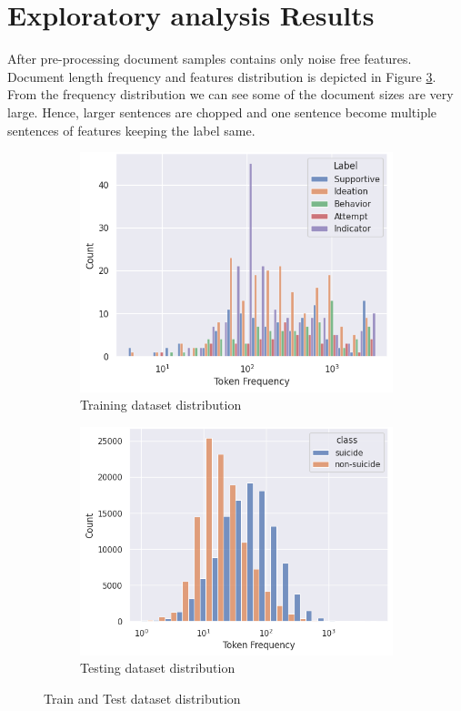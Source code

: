 \documentclass[sn-mathphys,Numbered]{sn-jnl}%
\theoremstyle{thmstyleone}%
\theoremstyle{thmstyletwo}%
\theoremstyle{thmstylethree}%
\begin{document}
\section{Exploratory analysis Results}
\label{exp_anal}
After pre-processing document samples contains only noise free features. Document length frequency and features distribution is depicted in Figure \ref{Redditdist_Twitterdist_together}. From the frequency distribution we can see some of the document sizes are very large. Hence, larger sentences are chopped and one sentence become multiple sentences of features keeping the label same. 
\begin{figure}[H]
\centering
\begin{subfigure}{0.45\textwidth}
    \includegraphics[width=\textwidth]{Reddit_dist.png}
    \caption{Training dataset distribution}
    \label{Redditdist}
\end{subfigure}
\hfill
\begin{subfigure}{0.45\textwidth}
    \includegraphics[width=\textwidth]{Twitterdist.png}
    \caption{Testing dataset distribution}
    \label{Twitterdist}
\end{subfigure}       
\caption{Train and Test dataset distribution}
\label{Redditdist_Twitterdist_together}
\end{figure}
\end{document}
